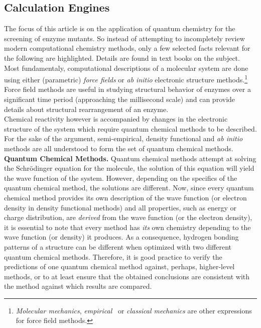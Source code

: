 \subsection{Calculation Engines}\label{sec:calculation_engines}
The focus of this article is on the application of quantum chemistry for the screening of enzyme mutants.
So instead of attempting to incompletely review modern computational chemistry methods, only a few selected facts relevant for the following are highlighted.
Details are found in text books on the subject\cite{young2004computational, jensen2007introduction, cramer2013essentials}.\\
Most fundamentaly, computational descriptions of a molecular system are done using either (parametric) \textit{force fields} or \textit{ab initio} electronic structure methods.\footnote{\textit{Molecular mechanics}, \textit{empirical } or \textit{classical mechanics} are other expressions for force field methods.}
Force field methods are useful in studying structural behavior of enzymes over a significant time period (approaching the millisecond scale) and can provide details about structural rearrangement of an enzyme.\\
Chemical reactivity however is accompanied by changes in the electronic structure of the system which require quantum chemical methods to be described.
For the sake of the argument, semi-empirical, density functional and \textit{ab initio} methods are all understood to form the set of quantum chemical methods.\\
\textbf{Quantum Chemical Methods.}
Quantum chemical methods attempt at solving the Schr{\"o}dinger equation for the molecule, the solution of this equation will yield the wave function of the system.
However, depending on the specifics of the quantum chemical method, the solutions are different.
Now, since every quantum chemical method provides its own description of the wave function (or electron density in density functional methods) and all properties, such as energy or charge distribution, are \textit{derived} from the wave function (or the electron density), it is essential to note that every method has \textit{its} own chemistry depending to the wave function (or density) it produces.
As a consequence, hydrogen bonding patterns of a structure can be different when optimized with two different quantum chemical methods.
Therefore, it is good practice to verify the predictions of one quantum chemical method against, perhaps, higher-level methods, or to at least ensure that the obtained conclusions are consistent with the method against which results are compared.
